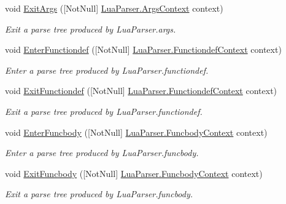 \begin{DoxyCompactItemize}
void \mbox{\hyperlink{interfacezlua_1_1_i_lua_listener_ad480b971cdba492e0fb0221dc80bb690}{Exit\+Args}} (\mbox{[}Not\+Null\mbox{]} \mbox{\hyperlink{classzlua_1_1_lua_parser_1_1_args_context}{Lua\+Parser.\+Args\+Context}} context)
\begin{DoxyCompactList}\small\item\em Exit a parse tree produced by Lua\+Parser.\+args. \end{DoxyCompactList}\item 
void \mbox{\hyperlink{interfacezlua_1_1_i_lua_listener_af2184c75516162b18685ef6dce9e9047}{Enter\+Functiondef}} (\mbox{[}Not\+Null\mbox{]} \mbox{\hyperlink{classzlua_1_1_lua_parser_1_1_functiondef_context}{Lua\+Parser.\+Functiondef\+Context}} context)
\begin{DoxyCompactList}\small\item\em Enter a parse tree produced by Lua\+Parser.\+functiondef. \end{DoxyCompactList}\item 
void \mbox{\hyperlink{interfacezlua_1_1_i_lua_listener_a61203f381bc56ad4df13efd83138aeec}{Exit\+Functiondef}} (\mbox{[}Not\+Null\mbox{]} \mbox{\hyperlink{classzlua_1_1_lua_parser_1_1_functiondef_context}{Lua\+Parser.\+Functiondef\+Context}} context)
\begin{DoxyCompactList}\small\item\em Exit a parse tree produced by Lua\+Parser.\+functiondef. \end{DoxyCompactList}\item 
void \mbox{\hyperlink{interfacezlua_1_1_i_lua_listener_afb6c93f652b5230dbe2972642281f66b}{Enter\+Funcbody}} (\mbox{[}Not\+Null\mbox{]} \mbox{\hyperlink{classzlua_1_1_lua_parser_1_1_funcbody_context}{Lua\+Parser.\+Funcbody\+Context}} context)
\begin{DoxyCompactList}\small\item\em Enter a parse tree produced by Lua\+Parser.\+funcbody. \end{DoxyCompactList}\item 
void \mbox{\hyperlink{interfacezlua_1_1_i_lua_listener_aecf5d1d01d7cf2dbe880d431e6f5f66f}{Exit\+Funcbody}} (\mbox{[}Not\+Null\mbox{]} \mbox{\hyperlink{classzlua_1_1_lua_parser_1_1_funcbody_context}{Lua\+Parser.\+Funcbody\+Context}} context)
\begin{DoxyCompactList}\small\item\em Exit a parse tree produced by Lua\+Parser.\+funcbody. \end{DoxyCompactList}\item 

\end{DoxyCompactItemize}
